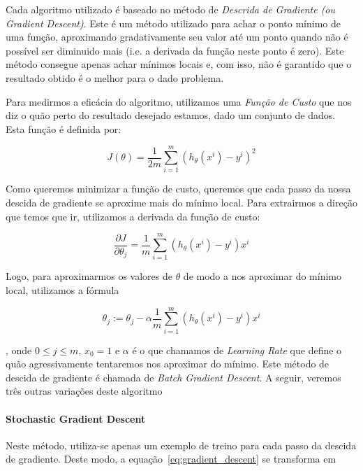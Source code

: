 \documentclass[conference]{IEEEtran}
\begin{document}
Cada algoritmo utilizado é baseado no método de \textit{Descrida de Gradiente (ou Gradient Descent)}. Este é um método utilizado para achar o ponto mínimo de uma função, aproximando gradativamente seu valor até um ponto quando não é possível ser diminuido mais (i.e. a derivada da função neste ponto é zero). Este método consegue apenas achar mínimos locais e, com isso, não é garantido que o resultado obtido é o melhor para o dado problema.

Para medirmos a eficácia do algoritmo, utilizamos uma \textit{Função de Custo} que nos diz o quão perto do resultado desejado estamos, dado um conjunto de dados. Esta função é definida por:

\begin{equation} \label{eq:cost_function}
J(\theta) = \dfrac{1}{2m} \sum_{i=1}^{m}(h_{\theta}(x^{i}) - y^{i})^2
\end{equation}

Como queremos minimizar a função de custo, queremos que cada passo da nossa descida de gradiente se aproxime mais do mínimo local. Para extrairmos a direção que temos que ir, utilizamos a derivada da função de custo:

\begin{equation} \label{eq:cost_derivative}
\dfrac{\partial J}{\partial \theta_{j}} = \dfrac{1}{m} \sum_{i=1}^{m}(h_{\theta}(x^{i}) - y^{i}) x^{i}
\end{equation}

Logo, para aproximarmos os valores de $\theta$ de modo a nos aproximar do mínimo local, utilizamos a fórmula

\begin{equation} \label{eq:gradient_descent}
\theta_{j} := \theta_{j} - \alpha \dfrac{1}{m} \sum_{i=1}^{m}(h_{\theta}(x^{i}) - y^{i}) x^{i}
\end{equation}

, onde $0 \leq j \leq m$, $x_{0} = 1$ e $\alpha$ é o que chamamos de \textit{Learning Rate} que define o quão agressivamente tentaremos nos aproximar do mínimo. Este método de descida de gradiente é chamada de \textit{Batch Gradient Descent}. A seguir, veremos três outras variações deste algoritmo

\paragraph{Stochastic Gradient Descent}

Neste método, utiliza-se apenas um exemplo de treino para cada passo da descida de gradiente. Deste modo, a equação~\ref{eq:gradient_descent} se transforma em
\end{document}
